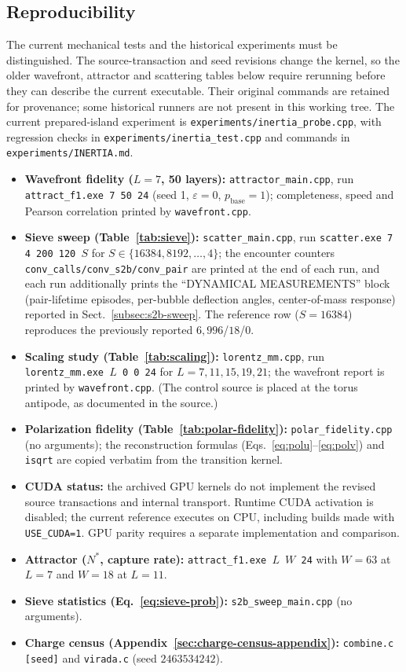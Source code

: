 \documentclass{ijuc}
\begin{document}
\subsection{Reproducibility}
The current mechanical tests and the historical experiments must be distinguished. The source-transaction and seed revisions change the kernel, so the older wavefront, attractor and scattering tables below require rerunning before they can describe the current executable. Their original commands are retained for provenance; some historical runners are not present in this working tree. The current prepared-island experiment is \texttt{experiments/inertia\_probe.cpp}, with regression checks in \texttt{experiments/inertia\_test.cpp} and commands in \texttt{experiments/INERTIA.md}.
\begin{itemize}
\item \textbf{Wavefront fidelity ($L=7$, 50 layers):} \texttt{attractor\_main.cpp}, run \texttt{attract\_f1.exe 7 50 24} (seed 1, $\varepsilon=0$, $p_{\mathrm{base}}=1$); completeness, speed and Pearson correlation printed by \texttt{wavefront.cpp}.
\item \textbf{Sieve sweep (Table~\ref{tab:sieve}):} \texttt{scatter\_main.cpp}, run \texttt{scatter.exe 7 4 200 120 $S$} for $S\in\{16384,8192,\dots,4\}$; the encounter counters \texttt{conv\_calls/conv\_s2b/conv\_pair} are printed at the end of each run, and each run additionally prints the ``DYNAMICAL MEASUREMENTS'' block (pair-lifetime episodes, per-bubble deflection angles, center-of-mass response) reported in Sect.~\ref{subsec:s2b-sweep}.  The reference row ($S=16384$) reproduces the previously reported $6{,}996$/$18$/$0$.
\item \textbf{Scaling study (Table~\ref{tab:scaling}):} \texttt{lorentz\_mm.cpp}, run \texttt{lorentz\_mm.exe $L$ 0 0 24} for $L=7,11,15,19,21$; the wavefront report is printed by \texttt{wavefront.cpp}.  (The control source is placed at the torus antipode, as documented in the source.)
\item \textbf{Polarization fidelity (Table~\ref{tab:polar-fidelity}):} \texttt{polar\_fidelity.cpp} (no arguments); the reconstruction formulas (Eqs.~\eqref{eq:polu}--\eqref{eq:polv}) and \texttt{isqrt} are copied verbatim from the transition kernel.
\item \textbf{CUDA status:} the archived GPU kernels do not implement the revised source transactions and internal transport. Runtime CUDA activation is disabled; the current reference executes on CPU, including builds made with \texttt{USE\_CUDA=1}. GPU parity requires a separate implementation and comparison.
\item \textbf{Attractor ($N^{*}$, capture rate):} \texttt{attract\_f1.exe $L$ $W$ 24} with $W=63$ at $L=7$ and $W=18$ at $L=11$.
\item \textbf{Sieve statistics (Eq.~\eqref{eq:sieve-prob}):} \texttt{s2b\_sweep\_main.cpp} (no arguments).
\item \textbf{Charge census (Appendix~\ref{sec:charge-census-appendix}):} \texttt{combine.c [seed]} and \texttt{virada.c} (seed $2463534242$).
\end{itemize}
\end{document}
